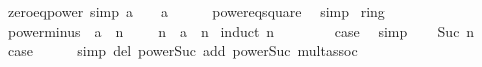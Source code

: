 \begin{isabellebody}
\endisatagproof
{\isafoldproof}%
%
\isadelimproof
\isanewline
%
\endisadelimproof
\isanewline
{}\isamarkupfalse%
\ zero{\isacharunderscore}{\kern0pt}eq{\isacharunderscore}{\kern0pt}power{}\ {\isacharbrackleft}{\kern0pt}simp{\isacharbrackright}{\kern0pt}{\isacharcolon}{\kern0pt}\ {\isachardoublequoteopen}a\ {\isacharequal}{\kern0pt}\ {}\ {\isasymlongleftrightarrow}\ a\ {\isacharequal}{\kern0pt}\ {}{\isachardoublequoteclose}\isanewline
%
\isadelimproof
\ \ %
\endisadelimproof
%
\isatagproof
{}\isamarkupfalse%
\ power{}{\isacharunderscore}{\kern0pt}eq{\isacharunderscore}{\kern0pt}square\ \isamarkupfalse%
\ simp%
\endisatagproof
{\isafoldproof}%
%
\isadelimproof
\isanewline
%
\endisadelimproof
\isanewline
{}\isamarkupfalse%
\isanewline
\isanewline
{}\isamarkupfalse%
\ ring{\isacharunderscore}{\kern0pt}{}\isanewline
{}\isanewline
\isanewline
{}\isamarkupfalse%
\ power{\isacharunderscore}{\kern0pt}minus{\isacharcolon}{\kern0pt}\ {\isachardoublequoteopen}{\isacharparenleft}{\kern0pt}{\isacharminus}{\kern0pt}\ a{\isacharparenright}{\kern0pt}\ {\isacharcircum}{\kern0pt}\ n\ {\isacharequal}{\kern0pt}\ {\isacharparenleft}{\kern0pt}{\isacharminus}{\kern0pt}\ {}{\isacharparenright}{\kern0pt}\ {\isacharcircum}{\kern0pt}\ n\ {\isacharasterisk}{\kern0pt}\ a\ {\isacharcircum}{\kern0pt}\ n{\isachardoublequoteclose}\isanewline
%
\isadelimproof
%
\endisadelimproof
%
\isatagproof
{}\isamarkupfalse%
\ {\isacharparenleft}{\kern0pt}induct\ n{\isacharparenright}{\kern0pt}\isanewline
\ \ \isamarkupfalse%
\ {}\isanewline
\ \ \isamarkupfalse%
\ {\isacharquery}{\kern0pt}case\ \isamarkupfalse%
\ simp\isanewline
{}\isamarkupfalse%
\isanewline
\ \ \isamarkupfalse%
\ {\isacharparenleft}{\kern0pt}Suc\ n{\isacharparenright}{\kern0pt}\isanewline
\ \ \isamarkupfalse%
\ \isamarkupfalse%
\ {\isacharquery}{\kern0pt}case\isanewline
\ \ \ \ \isamarkupfalse%
\ {\isacharparenleft}{\kern0pt}simp\ del{\isacharcolon}{\kern0pt}\ power{\isacharunderscore}{\kern0pt}Suc\ add{\isacharcolon}{\kern0pt}\ power{\isacharunderscore}{\kern0pt}Suc{}\ mult{\isachardot}{\kern0pt}assoc{\isacharparenright}{\kern0pt}\isanewline
{}\isamarkupfalse%
%
\endisatagproof
{\isafoldproof}%
%
\isadelimproof
\isanewline
%
\endisadelimproof

\end{isabellebody}
